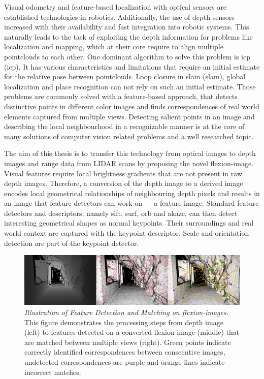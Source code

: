 Visual odometry\cite{he_tvc2019} and \gls{feature}-based localization with optical sensors\cite{sattler_cvpr2018} are established technologies in robotics.
Additionally, the use of depth sensors increased with their availability and fast integration into robotic systems.
This naturally leads to the task of exploiting the depth information for problems like localization and mapping, which at their core require to align multiple pointclouds to each other.
One dominant algorithm to solve this problem is \acrshort{icp} (\acrlong{icp})\cite{besl_pami1992}.
It has various characteristics and limitations that require an initial estimate for the relative pose between pointclouds\cite{rusinkiewicz_ieee2001}.
Loop closure in \acrshort{slam} (\acrlong{slam})\cite{ho_ros2006}, global localization and place recognition\cite{sattler_2011} can not rely on such an initial estimate.
Those problems are commonly solved with a \gls{feature}-based approach, that detects distinctive points in different color images and finds correspondences of real world elements captured from multiple views.
Detecting salient points in an image and describing the local neighbourhood in a recognizable manner is at the core of many solutions of computer vision related problems and a well researched topic\cite{andersson_2016}.

The aim of this thesis is to transfer this technology from optical images to depth images and range data from \acrshort{LIDAR} scans by proposing the novel \Gls{flexion-image}.
Visual features require local brightness gradients that are not present in raw depth images.
Therefore, a conversion of the depth image to a derived image encodes local geometrical relationships of neighbouring depth pixels and results in an image that feature detectors can work on --- a feature image.
Standard feature detectors and descriptors, namely \acrshort{sift}, \acrshort{surf}, \acrshort{orb} and \acrshort{akaze}, can then detect interesting geometrical shapes as normal keypoints.
Their surroundings and real world context are captured with the keypoint descriptor.
Scale and orientation detection are part of the keypoint detector.
\begin{figure}[htb]
    \includegraphics[width=\linewidth]{chapter01/masterarbeit_method.png}
    \caption[Illustration of Feature Detection and Matching on \Glspl{flexion-image}]{\emph{Illustration of Feature Detection and Matching on \Glspl{flexion-image}.} This figure demonstrates the processing steps from depth image (left) to features detected on a converted \gls{flexion-image} (middle) that are matched between multiple views (right). Green points indicate correctly identified correspondences between consecutive images, undetected correspondences are purple and orange lines indicate incorrect matches.}\label{fig:method_example}
\end{figure}

